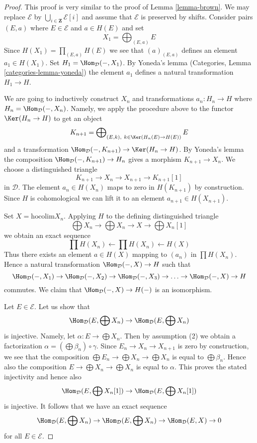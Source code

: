 \begin{proof}
This proof is very similar to the proof of Lemma \ref{lemma-brown}.
We may replace $\mathcal{E}$ by
$\bigcup_{i \in \mathbf{Z}} \mathcal{E}[i]$ and assume
that $\mathcal{E}$ is preserved by shifts.
Consider pairs $(E, a)$ where $E \in \mathcal{E}$ and $a \in H(E)$ and set
$$
X_1 = \bigoplus\nolimits_{(E, a)} E
$$
Since $H(X_1) = \prod_{(E, a)} H(E)$ we see that $(a)_{(E, a)}$
defines an element $a_1 \in H(X_1)$. Set $H_1 = \Hom_\mathcal{D}(- , X_1)$.
By Yoneda's lemma (Categories, Lemma \ref{categories-lemma-yoneda})
the element $a_1$ defines a natural transformation $H_1 \to H$.

\medskip\noindent
We are going to inductively construct $X_n$ and transformations
$a_n : H_n \to H$ where $H_n = \Hom_\mathcal{D}(-, X_n)$.
Namely, we apply the procedure
above to the functor $\Ker(H_n \to H)$ to get an object
$$
K_{n + 1} = \bigoplus\nolimits_{(E, k),\ k \in \Ker(H_n(E) \to H(E))} E
$$
and a transformation $\Hom_\mathcal{D}(-, K_{n + 1}) \to \Ker(H_n \to H)$.
By Yoneda's lemma the composition $\Hom_\mathcal{D}(-, K_{n + 1}) \to H_n$
gives a morphism $K_{n + 1} \to X_n$. We choose
a distinguished triangle
$$
K_{n + 1} \to X_n \to X_{n + 1} \to K_{n + 1}[1]
$$
in $\mathcal{D}$. The element $a_n \in H(X_n)$ maps to zero
in $H(K_{n + 1})$ by construction. Since $H$ is cohomological
we can lift it to an element $a_{n + 1} \in H(X_{n + 1})$.

\medskip\noindent
Set $X = \text{hocolim} X_n$. Applying $H$
to the defining distinguished triangle
$$
\bigoplus X_n \to
\bigoplus X_n \to X \to
\bigoplus X_n[1]
$$
we obtain an exact sequence
$$
\prod H(X_n) \leftarrow
\prod H(X_n) \leftarrow
H(X)
$$
Thus there exists an element $a \in H(X)$ mapping to $(a_n)$
in $\prod H(X_n)$. Hence a natural transformation
$\Hom_\mathcal{D}(- , X) \to H$ such that
$$
\Hom_\mathcal{D}(-, X_1) \to
\Hom_\mathcal{D}(-, X_2) \to
\Hom_\mathcal{D}(-, X_3) \to \ldots \to
\Hom_\mathcal{D}(-, X) \to H
$$
commutes. We claim that $\Hom_\mathcal{D}(-, X) \to H(-)$ is an isomorphism.

\medskip\noindent
Let $E \in \mathcal{E}$. Let us show that
$$
\Hom_\mathcal{D}(E, \bigoplus X_n) \to  \Hom_\mathcal{D}(E, \bigoplus X_n)
$$
is injective. Namely, let $\alpha : E \to \bigoplus X_n$. Then
by assumption (2) we obtain a factorization
$\alpha = (\bigoplus \beta_n) \circ \gamma$.
Since $E_n \to X_n \to X_{n + 1}$ is zero by construction, we see that
the composition $\bigoplus E_n \to \bigoplus X_n \to \bigoplus X_n$
is equal to $\bigoplus \beta_n$. Hence also the composition
$E \to \bigoplus X_n \to \bigoplus X_n$ is equal to $\alpha$.
This proves the stated injectivity and hence also
$$
\Hom_\mathcal{D}(E, \bigoplus X_n[1]) \to \Hom_\mathcal{D}(E, \bigoplus X_n[1])
$$
is injective. It follows that we have an exact sequence
$$
\Hom_\mathcal{D}(E, \bigoplus X_n) \to
\Hom_\mathcal{D}(E, \bigoplus X_n) \to
\Hom_\mathcal{D}(E, X) \to 0
$$
for all $E \in \mathcal{E}$.


\end{proof}
